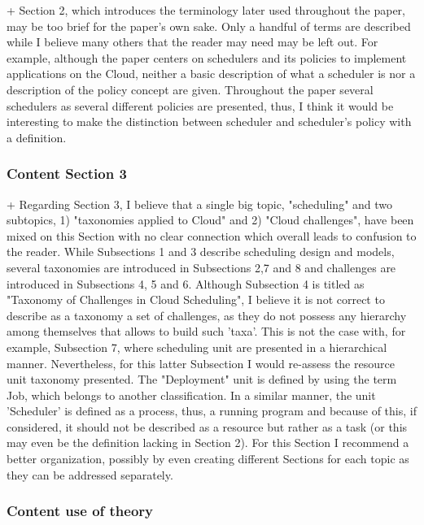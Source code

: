 + Section 2, which introduces the terminology later used throughout the paper, may be too brief for the paper's own sake. Only a handful of terms are described while I believe many others that the reader may need may be left out. For example, although the paper centers on schedulers and its policies to implement applications on the Cloud, neither a basic description of what a scheduler is nor a description of the policy concept are given. Throughout the paper several schedulers as several different policies are presented, thus, I think it would be interesting to make the distinction between scheduler and scheduler's policy with a definition.




\subsubsection{Content Section 3}

+ Regarding Section 3, I believe that a single big topic, "scheduling" and two subtopics, 1) "taxonomies applied to Cloud" and 2) "Cloud challenges", have been mixed on this Section with no clear connection which overall leads to confusion to the reader. While Subsections 1 and 3 describe scheduling design and models, several taxonomies are introduced in Subsections 2,7 and 8 and challenges are introduced in Subsections 4, 5 and 6. Although Subsection 4 is titled as "Taxonomy of Challenges in Cloud Scheduling", I believe it is not correct to describe as a taxonomy a set of challenges, as they do not possess any hierarchy among themselves that allows to build such 'taxa'. This is not the case with, for example, Subsection 7, where scheduling unit are presented in a hierarchical manner. Nevertheless, for this latter Subsection I would re-assess the resource unit taxonomy presented. The "Deployment" unit is defined by using the term Job, which belongs to another classification. In a similar manner, the unit 'Scheduler' is defined as a process, thus, a running program and because of this, if considered, it should not be described as a resource but rather as a task (or this may even be the definition lacking in Section 2). For this Section I recommend a better organization, possibly by even creating different Sections for each topic as they can be addressed separately.



\subsubsection{Content use of theory}

